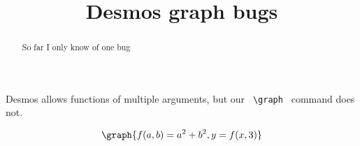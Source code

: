 \documentclass[handout]{ximera}
\title{Desmos graph bugs}
\begin{document}
\begin{abstract} So far I only know of one bug
\end{abstract}


\maketitle

Desmos allows functions of multiple arguments, but our \verb! \graph !
command does not.

\[ \graph{ f(a,b) = a^2 + b^2, y = f( x, 3 ) } \]
\end{document}

